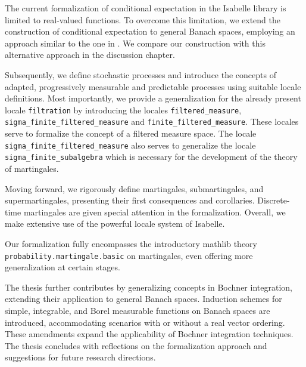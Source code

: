 The current formalization of conditional expectation in the Isabelle library is limited to real-valued functions. To overcome this limitation, we extend the construction of conditional expectation to general Banach spaces, employing an approach similar to the one in \cite{Hytoenen_2016}. We compare our construction with this alternative approach in the discussion chapter.

Subsequently, we define stochastic processes and introduce the concepts of adapted, progressively measurable and predictable processes using suitable locale definitions. Most importantly, we provide a generalization for the already present locale \lstinline{filtration} by introducing the locales \lstinline{filtered_measure}, \lstinline{sigma_finite_filtered_measure} and  \lstinline{finite_filtered_measure}. These locales serve to formalize the concept of a filtered measure space. The locale \lstinline{sigma_finite_filtered_measure} also serves to generalize the locale \lstinline{sigma_finite_subalgebra} which is necessary for the development of the theory of martingales. 

Moving forward, we rigorously define martingales, submartingales, and supermartingales, presenting their first consequences and corollaries. Discrete-time martingales are given special attention in the formalization. Overall, we make extensive use of the powerful locale system of Isabelle.

Our formalization fully encompasses the introductory \textsf{mathlib} theory \texttt{probability.mar\-tingale.basic} on martingales, even offering more generalization at certain stages.

The thesis further contributes by generalizing concepts in Bochner integration, extending their application to general Banach spaces. Induction schemes for simple, integrable, and Borel measurable functions on Banach spaces are introduced, accommodating scenarios with or without a real vector ordering. These amendments expand the applicability of Bochner integration techniques.
The thesis concludes with reflections on the formalization approach and suggestions for future research directions.